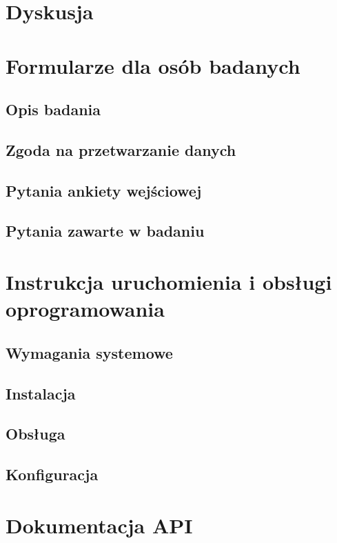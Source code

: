 \documentclass{./assets/wfis}
\begin{document}



\chapter{Dyskusja}\label{dyskusja}

\printbibliography

\clearpage
\listoffigures
\clearpage
\listoftables
\clearpage
\listoflistings
\clearpage

\appendix
\chapter{Formularze dla osób badanych}\label{formularz-dla-osoby-badanej}
\section{Opis badania}\label{opis-badania}
\section{Zgoda na przetwarzanie danych}\label{zgoda-na-przetwarzanie-danych}
\section{Pytania ankiety wejściowej}\label{pytania-ankiety-wejsciowej}
\section{Pytania zawarte w badaniu}\label{pytania-badania}
\chapter{Instrukcja uruchomienia i obsługi oprogramowania}\label{instrukcja}
\section{Wymagania systemowe}
\section{Instalacja}
\section{Obsługa}
\section{Konfiguracja}
\chapter{Dokumentacja API}\label{api}
\end{document}
